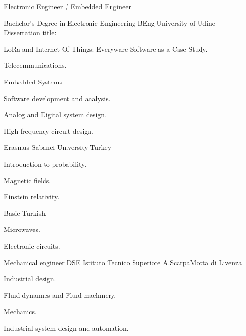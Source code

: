\documentclass[english,a4paper]{europasscv}
\begin{document}
	\begin{europasscv}

	\ecvpersonalinfo
	 {
		Electronic Engineer / Embedded Engineer
	}



		 {
			Bachelor's Degree in Electronic Engineering
		}{BEng}
		\ecvitem{} {
			University of Udine
		}
		\ecvitem{} {
			\textcolor{ecvhighlightcolor}{Dissertation title}:
		}
		\begin{center} {
				LoRa and Internet Of Things: \linebreak
				Everyware Software as a Case Study.
		}
		\end{center}
		\ecvitem{} {
			\begin{ecvitemize}
				\item Telecommunications.
				\item Embedded Systems.
				\item Software development and analysis.
				\item Analog and Digital system design.
				\item High frequency circuit design.
			\end{ecvitemize}
		}

		 {
			Erasmus
		}
		\ecvitem{} {
			Sabanci University Turkey \newline
		}
		\ecvitem{} {
			\begin{ecvitemize}
				\item Introduction to probability.
				\item Magnetic fields.
				\item Einstein relativity.
				\item Basic Turkish.
				\item Microwaves.
				\item Electronic circuits.
			\end{ecvitemize}
		}

		 {
			Mechanical engineer
		}{DSE}
		\ecvitem{} {
			Istituto Tecnico Superiore A.Scarpa\newline Motta di Livenza
		}
		\ecvitem{} {
			\begin{ecvitemize}
				\item Industrial design.
				\item Fluid-dynamics and Fluid machinery.
				\item Mechanics.
				\item Industrial system design and automation.
			\end{ecvitemize}
		}


\end{europasscv}
\end{document}
